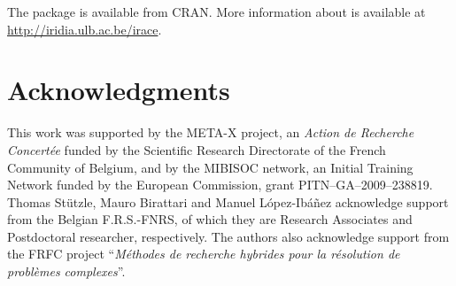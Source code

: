 \documentclass[article,a4paper,nojss,notitle]{jss}
\newcommand{\irace}{\pkg{irace}\xspace}
\begin{document}
The \irace package is available from CRAN. More information
about \irace is available at \url{http://iridia.ulb.ac.be/irace}.



\section*{Acknowledgments}
This work was supported by the
META-X project, an \emph{Action de Recherche Concert\'ee} funded by
the Scientific Research Directorate of the French Community of
Belgium, and by the MIBISOC network, an Initial Training Network
funded by the European Commission, grant PITN--GA--2009--238819.
Thomas St\"utzle, Mauro Birattari and Manuel L\'opez-Ib\'a\~nez acknowledge support from the Belgian 
F.R.S.-FNRS, of which they are Research Associates and Postdoctoral researcher, respectively. 
The authors also acknowledge support
from the FRFC project ``\emph{M{\'e}thodes de recherche hybrides pour
  la r{\'e}solution de probl{\`e}mes complexes}''.
\end{document}
